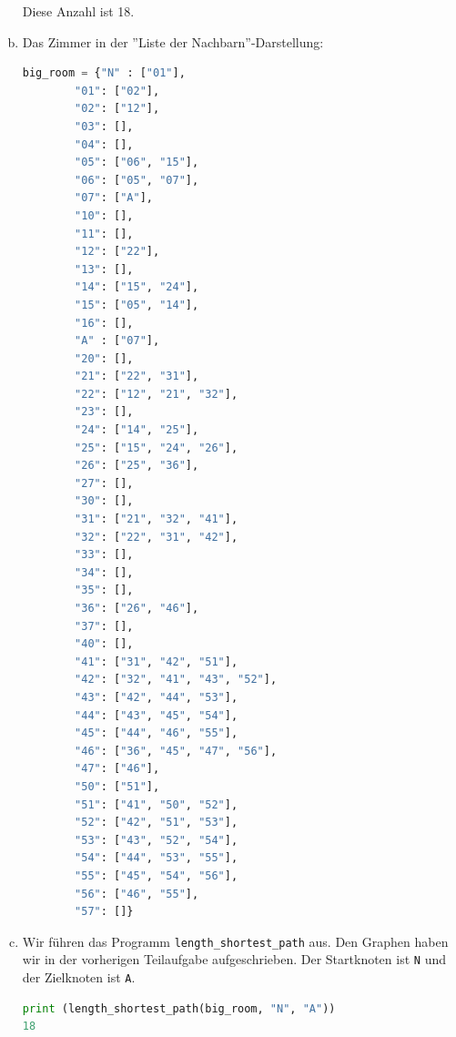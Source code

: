 \begin{enumerate}[(a)]
Diese Anzahl ist 18.
\item Das Zimmer in der ''Liste der Nachbarn''-Darstellung:
\begin{lstlisting}[language=Python]
big_room = {"N" : ["01"],
        "01": ["02"],
        "02": ["12"],
        "03": [],
        "04": [],
        "05": ["06", "15"],
        "06": ["05", "07"],
        "07": ["A"],
        "10": [],
        "11": [],
        "12": ["22"],
        "13": [],
        "14": ["15", "24"],
        "15": ["05", "14"],
        "16": [],
        "A" : ["07"],
        "20": [],
        "21": ["22", "31"],
        "22": ["12", "21", "32"],
        "23": [],
        "24": ["14", "25"],
        "25": ["15", "24", "26"],
        "26": ["25", "36"],
        "27": [],
        "30": [],
        "31": ["21", "32", "41"],
        "32": ["22", "31", "42"],
        "33": [],
        "34": [],
        "35": [],
        "36": ["26", "46"],
        "37": [],
        "40": [],
        "41": ["31", "42", "51"],
        "42": ["32", "41", "43", "52"],
        "43": ["42", "44", "53"],
        "44": ["43", "45", "54"],
        "45": ["44", "46", "55"],
        "46": ["36", "45", "47", "56"],
        "47": ["46"],
        "50": ["51"],
        "51": ["41", "50", "52"],
        "52": ["42", "51", "53"],
        "53": ["43", "52", "54"],
        "54": ["44", "53", "55"],
        "55": ["45", "54", "56"],
        "56": ["46", "55"],
        "57": []}
\end{lstlisting}

\item Wir führen das Programm \texttt{length\_shortest\_path} aus. Den Graphen haben wir in der vorherigen Teilaufgabe aufgeschrieben. Der Startknoten ist \texttt{N} und der Zielknoten ist \texttt{A}.
\begin{lstlisting}[language=Python]
print (length_shortest_path(big_room, "N", "A"))
18
\end{lstlisting}
\end{enumerate}

